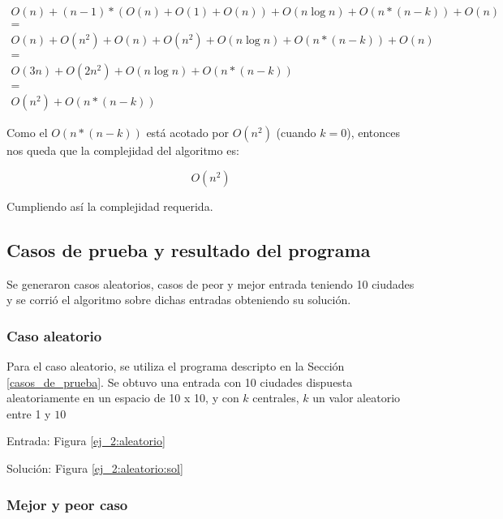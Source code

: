 \begin{equation}
\label{ej_2:cota:formula}
\begin{split}
	O(n) + (n-1)*(O(n) + O(1) + O(n)) + O(n \log n) + O(n*(n - k)) + O(n) \\
= \\
O(n) + O(n^2) + O(n) + O(n^2) + O(n \log n) + O(n*(n - k)) + O(n)\\
= \\
O(3n) + O(2n^2) + O(n \log n) + O(n*(n - k))\\
= \\
O(n^2) + O(n*(n - k))
\end{split}
\end{equation}

Como el $O(n*(n - k))$ est\'a acotado por $O(n^2)$ (cuando $k = 0$), entonces nos queda que la complejidad del algoritmo es:

\begin{equation*}
	O(n^2)
\end{equation*}

Cumpliendo as\'i la complejidad requerida.

\subsection{Casos de prueba y resultado del programa} \label{ej_2:casos}

Se generaron casos aleatorios, casos de peor y mejor entrada teniendo 10 ciudades y se corri\'o el algoritmo sobre dichas entradas obteniendo su soluci\'on.

\subsubsection{Caso aleatorio}

Para el caso aleatorio, se utiliza el programa descripto en la Secci\'on \ref{casos_de_prueba}. Se obtuvo una entrada con 10 ciudades dispuesta aleatoriamente en un espacio de 10 x 10, y con $k$ centrales, $k$ un valor aleatorio entre 1 y $10$

Entrada: Figura \ref{ej_2:aleatorio}


Soluci\'on: Figura \ref{ej_2:aleatorio:sol}


\subsubsection{Mejor y peor caso}

